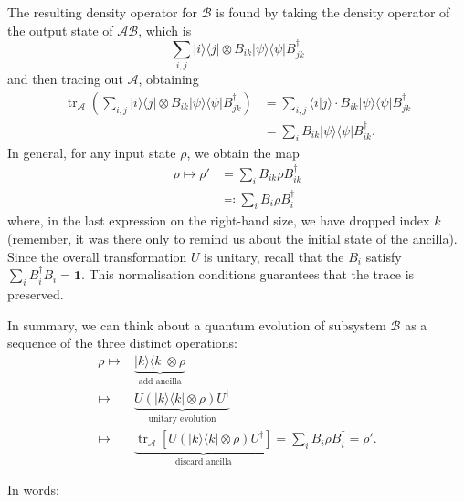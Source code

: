 \documentclass[fleqn,a4paper]{article}
\renewcommand{\footnote}[1]{\sidenotetext[{\color{white}0}\!\!]{\footnotesize #1}}
\newenvironment{idea}{\everypar{\setlength{\parindent}{1.5em}}}{}
\theoremstyle{definition}
\theoremstyle{definition}
\theoremstyle{definition}
\theoremstyle{definition}
\theoremstyle{remark}
\begin{document}
The resulting density operator for \(\mathcal{B}\) is found by taking the density operator of the output state of \(\mathcal{AB}\), which is
\[
  \sum_{i,j} |i\rangle\langle j|\otimes B_{ik}|\psi\rangle\langle\psi|B_{jk}^\dagger
\]
and then tracing out \(\mathcal{A}\), obtaining\footnote{Recall that \(\langle i|j\rangle=\delta_{ij}\).}
\[
  \begin{aligned}
    \operatorname{tr}_\mathcal{A} \left(
      \sum_{i,j} |i\rangle\langle j|\otimes B_{ik}|\psi\rangle\langle\psi|B_{jk}^\dagger
    \right)
    &= \sum_{i,j} \langle i|j\rangle\cdot B_{ik}|\psi\rangle\langle\psi|B_{jk}^\dagger
  \\&= \sum_i B_{ik}|\psi\rangle\langle\psi|B_{ik}^\dagger.
  \end{aligned}
\]
In general, for any input state \(\rho\), we obtain the map
\[
  \begin{aligned}
    \rho\longmapsto\rho'
    &= \sum_i B_{ik}\rho B^\dagger_{ik}
  \\&\eqqcolon \sum_i B_{i}\rho B^\dagger_{i}
  \end{aligned}
\]
where, in the last expression on the right-hand size, we have dropped index \(k\) (remember, it was there only to remind us about the initial state of the ancilla).
Since the overall transformation \(U\) is unitary, recall that the \(B_i\) satisfy \(\sum_i B_i^\dagger B_i=\mathbf{1}\).
This normalisation conditions guarantees that the trace is preserved.

\begin{idea}
In summary, we can think about a quantum evolution of subsystem \(\mathcal{B}\) as a sequence of the three distinct operations:
\[
  \begin{aligned}
    \rho
    \longmapsto &\underbrace{|k\rangle\langle k|\otimes\rho}_{\text{add ancilla}}
  \\\longmapsto &\underbrace{U(|k\rangle\langle k|\otimes\rho) U^\dagger}_{\text{unitary evolution}}
  \\\longmapsto &\underbrace{\operatorname{tr}_\mathcal{A} \left[U(|k\rangle\langle k|\otimes\rho) U^\dagger\right]}_{\text{discard ancilla}}
    = \sum_i B_{i}\rho B_{i}^\dagger
    =\rho'.
  \end{aligned}
\]

\end{idea}

In words:
\end{document}
